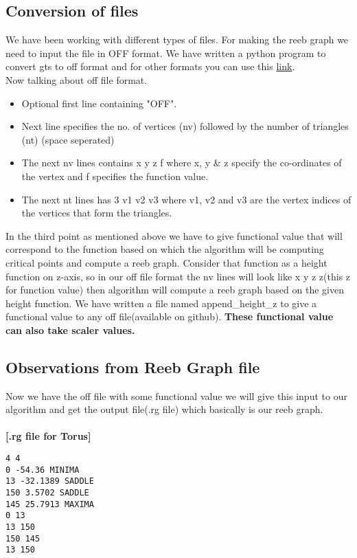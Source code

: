 \documentclass[a4paper]{article}
\begin{document}
\begin{multicols}{2}
\subsection{Conversion of files}
We have been working with different types of files. For making the reeb graph we need to input the file in OFF format. We have written a python program to convert gts to off format and for other formats you can use this \href{https://imagetostl.com/convert/file/obj/to/off}{link}.\\

Now talking about off file format.
\begin{itemize}
    \item Optional first line containing "OFF".
    \item Next line specifies the no. of vertices (nv) followed by the number of triangles (nt) (space seperated)
    \item The next nv lines contains x y z f where x, y & z specify the co-ordinates of the vertex and f specifies the function value. 
    \item The next nt lines has 3 v1 v2 v3 where v1, v2 and v3 are the vertex indices of the vertices that form the triangles.
\end{itemize} 
In the third point as mentioned above we have to give functional value that will correspond to the function based on which the algorithm will be computing critical points and compute a reeb graph. Consider that function as a height function on z-axis, so in our off file format the nv lines will look like x y z z(this z for function value) then algorithm will compute a reeb graph based on the given height function. We have written a file named append\_height\_z to give a functional value to any off file(available on github). \textbf{These functional value can also take scaler values.}

\subsection{Observations from Reeb Graph file}
Now we have the off file with some functional value we will give this input to our algorithm and get the output file(.rg file) which basically is our reeb graph.\\\\

\textbf{
[.rg file for Torus]\\}

\begin{lstlisting}
4 4
0 -54.36 MINIMA
13 -32.1389 SADDLE
150 3.5702 SADDLE
145 25.7913 MAXIMA
0 13 
13 150 
150 145 
13 150 


\end{lstlisting}
\end{multicols}
\end{document}
